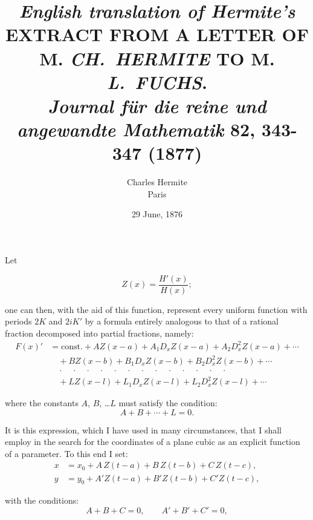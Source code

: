 \documentclass[12pt]{article}
\title{
    {\small\textit{English translation of Hermite's}} \\[0.5em] 
    \MakeUppercase{Extract from a letter of \\ M. \textit{Ch.\ Hermite} to M. \textit{L.\ Fuchs}.}
    \\[0.5em] {\small \textit{Journal für die reine und angewandte Mathematik} 82, 343-347 (1877)}
    }
\author{Charles Hermite \\ Paris }
\date{29 June, 1876}
\begin{document}
\maketitle

\medskip

Let

\begin{equation*}
Z(x) = \frac{H'(x)}{H(x)};
\end{equation*}

\noindent one can then, with the aid of this function, represent every uniform function with periods $2K$ and $2iK'$ by a formula entirely analogous to that of a rational fraction decomposed into partial fractions, namely:
\begin{align*}
F(x)' &= \text{const.} + AZ(x-a) + A_1 D_x Z(x-a) + A_2 D_x^2 Z(x-a) + \cdots \\
&\quad + BZ(x-b) + B_1 D_x Z(x-b) + B_2 D_x^2 Z(x-b) + \cdots \\
&\quad \cdot\quad\cdot\quad\cdot\quad\cdot\quad\cdot\quad\cdot\quad\cdot\quad\cdot\quad\cdot\quad\cdot\quad\cdot\quad\cdot\quad\cdot\\
&\quad + LZ(x-l) + L_1 D_x Z(x-l) + L_2 D_x^2 Z(x-l) + \cdots
\end{align*}

\noindent where the constants $A$, $B$, \ldots $L$ must satisfy the condition:
\begin{equation*}
A + B + \cdots + L = 0.
\end{equation*}

\noindent It is this expression, which I have used in many circumstances, that I shall employ in the search for the coordinates of a plane cubic as an explicit function of a parameter. To this end I set:
\begin{align*}
x &= x_0 + A\,Z(t-a) + B\,Z(t-b) + C\,Z(t-c),\\
y &= y_0 + A'Z(t-a) + B'Z(t-b) + C'Z(t-c),
\end{align*}

\noindent with the conditions:
\begin{equation*}
A + B + C = 0, \qquad A' + B' + C' = 0,
\end{equation*}
\end{document}
